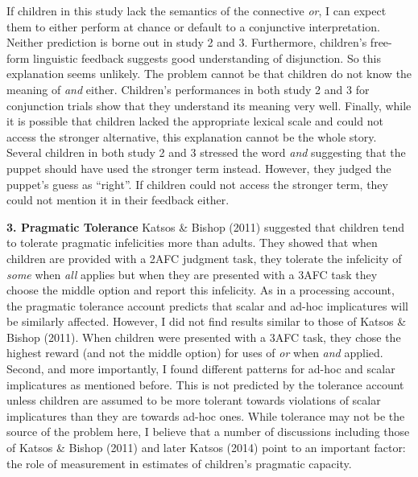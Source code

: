 \documentclass[oneside]{report}
\theoremstyle{definition}
\theoremstyle{definition}
\theoremstyle{definition}
\theoremstyle{remark}
\begin{document}
If children in this study lack the semantics of the connective
\emph{or}, I can expect them to either perform at chance or default to a
conjunctive interpretation. Neither prediction is borne out in study 2
and 3. Furthermore, children's free-form linguistic feedback suggests
good understanding of disjunction. So this explanation seems unlikely.
The problem cannot be that children do not know the meaning of
\emph{and} either. Children's performances in both study 2 and 3 for
conjunction trials show that they understand its meaning very well.
Finally, while it is possible that children lacked the appropriate
lexical scale and could not access the stronger alternative, this
explanation cannot be the whole story. Several children in both study 2
and 3 stressed the word \emph{and} suggesting that the puppet should
have used the stronger term instead. However, they judged the puppet's
guess as ``right''. If children could not access the stronger term, they
could not mention it in their feedback either.

\textbf{3. Pragmatic Tolerance} Katsos \& Bishop (2011) suggested that
children tend to tolerate pragmatic infelicities more than adults. They
showed that when children are provided with a 2AFC judgment task, they
tolerate the infelicity of \emph{some} when \emph{all} applies but when
they are presented with a 3AFC task they choose the middle option and
report this infelicity. As in a processing account, the pragmatic
tolerance account predicts that scalar and ad-hoc implicatures will be
similarly affected. However, I did not find results similar to those of
Katsos \& Bishop (2011). When children were presented with a 3AFC task,
they chose the highest reward (and not the middle option) for uses of
\emph{or} when \emph{and} applied. Second, and more importantly, I found
different patterns for ad-hoc and scalar implicatures as mentioned
before. This is not predicted by the tolerance account unless children
are assumed to be more tolerant towards violations of scalar
implicatures than they are towards ad-hoc ones. While tolerance may not
be the source of the problem here, I believe that a number of
discussions including those of Katsos \& Bishop (2011) and later Katsos
(2014) point to an important factor: the role of measurement in
estimates of children's pragmatic capacity.
\end{document}
